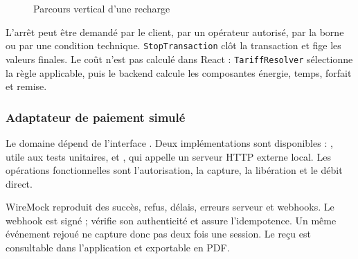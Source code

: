 \begin{figure}[H]
  \centering
  \caption{Parcours vertical d'une recharge}
  \label{fig:implementation-charging-flow}
\end{figure}

L'arrêt peut être demandé par le client, par un opérateur autorisé, par la borne
ou par une condition technique. \texttt{StopTransaction} clôt la transaction et
fige les valeurs finales. Le coût n'est pas calculé dans React :
\texttt{TariffResolver} sélectionne la règle applicable, puis le backend calcule
les composantes énergie, temps, forfait et remise.

\subsubsection{Adaptateur de paiement simulé}

Le domaine dépend de l'interface . Deux implémentations sont
disponibles : , utile aux tests unitaires, et
, qui appelle un serveur HTTP externe local. Les
opérations fonctionnelles sont l'autorisation, la capture, la libération et le
débit direct.

WireMock reproduit des succès, refus, délais, erreurs serveur et webhooks. Le
webhook est signé ;  vérifie son authenticité et
 assure l'idempotence. Un même événement
rejoué ne capture donc pas deux fois une session. Le reçu est consultable dans
l'application et exportable en PDF.

